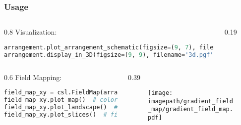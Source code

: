 \begin{frame}[fragile]
    \frametitle{Usage}
    \begin{columns}
        \begin{column}{0.8\textwidth}
            Visualization:
            \begin{lstlisting}[language=Python]
arrangement.plot_arrangement_schematic(figsize=(9, 7), filename='schematic.pgf')
arrangement.display_in_3D(figsize=(9, 9), filename='3d.pgf')
            \end{lstlisting}
        \end{column}
        \begin{column}{0.19\textwidth}
            \begin{figure}
                \centering
                \scalebox{0.3}{
                    \begin{pgfpicture}
                        \pgftext{}
                    \end{pgfpicture}
                }
            \end{figure}
        \end{column}
    \end{columns}

    \pause
    \vspace{0.5cm}
    \begin{columns}
        \begin{column}{0.6\textwidth}
            Field Mapping:
            \begin{lstlisting}[language=Python]
field_map_xy = csl.FieldMap(arrangement, 'xy', steps=100)
field_map_xy.plot_map()  # color map
field_map_xy.plot_landscape()  # 3D visualization
field_map_xy.plot_slices()  # field along axes
            \end{lstlisting}
        \end{column}
        \begin{column}{0.39\textwidth}
            \begin{figure}
                \centering
                \texttt{[image: \\imagepath/gradient\_field\_map/gradient\_field\_map.pdf]}
            \end{figure}
        \end{column}
    \end{columns}
\end{frame}

